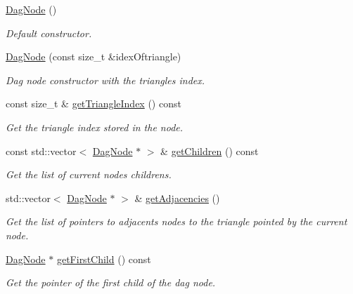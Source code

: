 \begin{DoxyCompactItemize}
\item 
\mbox{\label{classDagNode_a4ed19a5e9d5ada51128fcc181f9830ae}} 
\hyperlink{classDagNode_a4ed19a5e9d5ada51128fcc181f9830ae}{Dag\+Node} ()
\begin{DoxyCompactList}\small\item\em Default constructor. \end{DoxyCompactList}\item 
\hyperlink{classDagNode_add2a400bc282195020af9e32ada5b427}{Dag\+Node} (const size\+\_\+t \&idex\+Oftriangle)
\begin{DoxyCompactList}\small\item\em Dag node constructor with the triangle\textquotesingle{}s index. \end{DoxyCompactList}\item 
const size\+\_\+t \& \hyperlink{classDagNode_a5ff9ecbb6e1a5008c5b833afc8f08bab}{get\+Triangle\+Index} () const
\begin{DoxyCompactList}\small\item\em Get the triangle index stored in the node. \end{DoxyCompactList}\item 
const std\+::vector$<$ \hyperlink{classDagNode}{Dag\+Node} $\ast$ $>$ \& \hyperlink{classDagNode_a3d0c86f01088ead2007a1c64c1dddf77}{get\+Children} () const
\begin{DoxyCompactList}\small\item\em Get the list of current node\textquotesingle{}s childrens. \end{DoxyCompactList}\item 
std\+::vector$<$ \hyperlink{classDagNode}{Dag\+Node} $\ast$ $>$ \& \hyperlink{classDagNode_abc1bd7d5b2a39d85cd7bd924cdc984b3}{get\+Adjacencies} ()
\begin{DoxyCompactList}\small\item\em Get the list of pointers to adjacents nodes to the triangle pointed by the current node. \end{DoxyCompactList}\item 
\hyperlink{classDagNode}{Dag\+Node} $\ast$ \hyperlink{classDagNode_a35869cdb3ff3900d2ed4366270a39b83}{get\+First\+Child} () const
\begin{DoxyCompactList}\small\item\em Get the pointer of the first child of the dag node. \end{DoxyCompactList}\item 

\end{DoxyCompactItemize}
